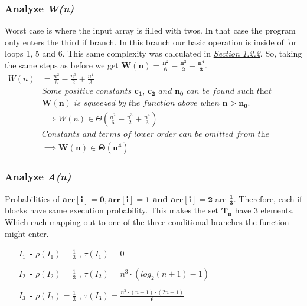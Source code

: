 \documentclass[10pt]{article}
\begin{document}
\subsubsection{Analyze \textit{W(n)}}
Worst case is where the input array is filled with twos. In that case the program only enters the third if branch. In this branch our basic operation is inside of for loops 1, 5 and 6. This same complexity was calculated in \hyperref[sec:thirdif]{\textit{Section 1.2.2}}. So, taking the same steps as before we get $\mathbf{W(n) =\frac{n^2}{6} - \frac{n^3}{2} + \frac{n^4}{3}}$. 
\begin{align*}
W(n) &= \frac{n^2}{6} - \frac{n^3}{2} + \frac{n^4}{3} \\
&\textit{Some positive constants $\mathbf{c_{1}}$, $\mathbf{c_{2}}$ and $\mathbf{n_{0}}$ can be found such that} \\ 
&\textit{$\mathbf{W(n)}$ is squeezed by the function above when $\mathbf{n > n_{0}}$.} \\
&\implies W(n) \in \Theta (\frac{n^2}{6} - \frac{n^3}{2} + \frac{n^4}{3}) \\
&\textit{Constants and terms of lower order can be omitted from the complexity class.} \\
&\implies \mathbf{W(n) \boldsymbol{\in} \Theta(n^{4})}
\end{align*}


\subsubsection{Analyze \textit{A(n)}}
Probabilities of $\mathbf{arr[i]=0 ,arr[i]=1 \text{ and } arr[i]=2}$ are $\boldsymbol{\frac{1}{3}}$. Therefore, each if blocks have same execution probability.
This makes the set $\mathbf{T_{n}}$ have 3 elements. Which each mapping out to one of the three conditional branches the function might enter. 
\begin{enumerate}[leftmargin=2.6cm]
    \item[\textit{\textbf{$I_{1}$ - }}] $\rho (\mathit{I_{1}}) = \frac{1}{3}$ ,  $\tau (\mathit{I_{1}})= 0$
    \item[\textit{\textbf{$I_{2}$ - }}] $\rho (\mathit{I_{2}}) = \frac{1}{3}$ ,  $\tau (\mathit{I_{2}}) = n^3 \cdot (log_2(n+1) - 1)$
    \item[\textit{\textbf{$I_{3}$ - }}] $\rho (\mathit{I_{3}}) = \frac{1}{3}$ ,  $\tau (\mathit{I_{3}}) = \frac{ n^2\cdot (n-1) \cdot (2n-1) } {6}$
\end{enumerate}
\end{document}
